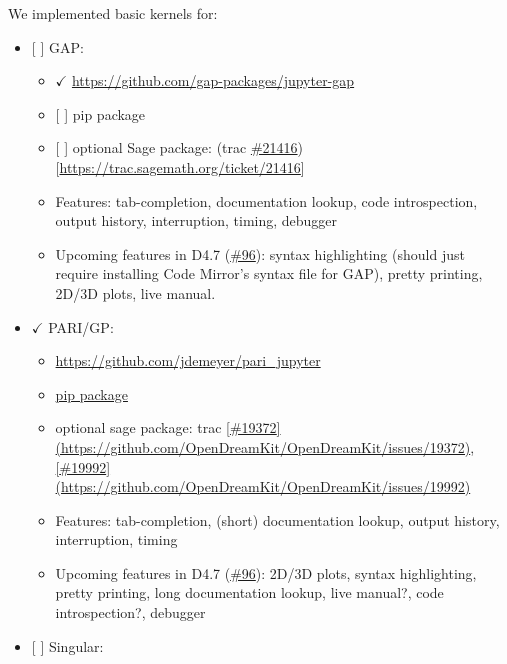 We implemented basic kernels for:

\begin{itemize}
\tightlist
\item
  {[} {]} GAP:

  \begin{itemize}
  \tightlist
  \item
    \(\checkmark\) \url{https://github.com/gap-packages/jupyter-gap}
  \item
    {[} {]} pip package
  \item
    {[} {]} optional Sage package: (trac
    \href{https://github.com/OpenDreamKit/OpenDreamKit/issues/21416}{\#21416}){[}\url{https://trac.sagemath.org/ticket/21416}{]}
  \item
    Features: tab-completion, documentation lookup, code introspection,
    output history, interruption, timing, debugger
  \item
    Upcoming features in D4.7
    (\href{https://github.com/OpenDreamKit/OpenDreamKit/issues/96}{\#96}):
    syntax highlighting (should just require installing Code Mirror's
    syntax file for GAP), pretty printing, 2D/3D plots, live manual.
  \end{itemize}
\item
  \(\checkmark\) PARI/GP:

  \begin{itemize}
  \tightlist
  \item
    \url{https://github.com/jdemeyer/pari_jupyter}
  \item
    \href{https://pypi.python.org/pypi/pari_jupyter}{pip package}
  \item
    optional sage package: trac
    \href{https://trac.sagemath.org/ticket/19372}{{[}\#19372{]}(https://github.com/OpenDreamKit/OpenDreamKit/issues/19372)},
    \href{https://trac.sagemath.org/ticket/19992}{{[}\#19992{]}(https://github.com/OpenDreamKit/OpenDreamKit/issues/19992)}
  \item
    Features: tab-completion, (short) documentation lookup, output
    history, interruption, timing
  \item
    Upcoming features in D4.7
    (\href{https://github.com/OpenDreamKit/OpenDreamKit/issues/96}{\#96}):
    2D/3D plots, syntax highlighting, pretty printing, long
    documentation lookup, live manual?, code introspection?, debugger
  \end{itemize}
\item
  {[} {]} Singular:


\end{itemize}
